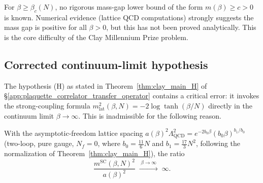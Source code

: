 \begin{remark}
\label{rem:weak_coupling}
For $\beta\ge\beta_{c}(N)$, no rigorous mass-gap lower bound of the form
$m(\beta)\ge c>0$ is known. Numerical evidence (lattice QCD computations) strongly
suggests the mass gap is positive for all $\beta>0$, but this has not been proved
analytically. This is the core difficulty of the Clay Millennium Prize problem.
\end{remark}

\subsection{Corrected continuum-limit hypothesis}
\label{ssec:pf_hypothesis_H_corrected}

The hypothesis (H) as stated in Theorem~\ref{thm:clay_main_H} of
\S\ref{app:plaquette_correlator_transfer_operator} contains a critical error:
it invokes the strong-coupling formula $m_{\mathrm{lat}}^{2}(\beta,N)=
-2\log\tanh(\beta/N)$ directly in the continuum limit $\beta\to\infty$.
This is inadmissible for the following reason.

\begin{lemma}
\label{lem:sc_diverges}
With the asymptotic-freedom lattice spacing
$a(\beta)^{2}\Lambda_{\mathrm{QCD}}^{2}=e^{-2b_{0}\beta}(b_{0}\beta)^{b_{1}/b_{0}}$
(two-loop, pure gauge, $N_{f}=0$, where $b_{0}=\frac{11}{6}N$ and
$b_{1}=\frac{17}{3}N^{2}$, following the normalization of
Theorem~\ref{thm:clay_main_H}), the ratio
\[
\frac{m^{\mathrm{SC}}(\beta,N)^{2}}{a(\beta)^{2}}
\;\xrightarrow{\;\beta\to\infty\;}\; \infty.
\]
\end{lemma}

